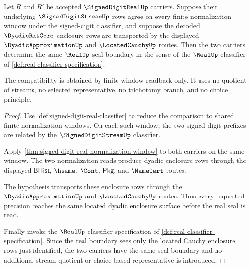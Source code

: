 \begin{theorem}
\label{thm:signed-digit-real-dyadic-seal-compatibility}
Let $R$ and $R'$ be accepted $\SignedDigitRealUp$ carriers. Suppose their underlying $\SignedDigitStreamUp$ rows agree on every finite normalization window under the signed-digit classifier, and suppose the decoded $\DyadicRatCore$ enclosure rows are transported by the displayed $\DyadicApproximationUp$ and $\LocatedCauchyUp$ routes. Then the two carriers determine the same $\RealUp$ seal boundary in the sense of the $\RealUp$ classifier of \autoref{def:real-classifier-specification}.

The compatibility is obtained by finite-window readback only. It uses no quotient of streams, no selected representative, no trichotomy branch, and no choice principle.
\end{theorem}
\begin{proof}
Use \autoref{def:signed-digit-real-classifier} to reduce the comparison to shared finite normalization windows. On each such window, the two signed-digit prefixes are related by the $\SignedDigitStreamUp$ classifier.

Apply \autoref{thm:signed-digit-real-normalization-window} to both carriers on the same window. The two normalization reads produce dyadic enclosure rows through the displayed $\mathsf{BHist}$, $\hsame$, $\Cont$, $\mathsf{Pkg}$, and $\NameCert$ routes.

The hypothesis transports these enclosure rows through the $\DyadicApproximationUp$ and $\LocatedCauchyUp$ routes. Thus every requested precision reaches the same located dyadic enclosure surface before the real seal is read.

Finally invoke the $\RealUp$ classifier specification of \autoref{def:real-classifier-specification}. Since the real boundary sees only the located Cauchy enclosure rows just identified, the two carriers have the same seal boundary and no additional stream quotient or choice-based representative is introduced.
\end{proof}

